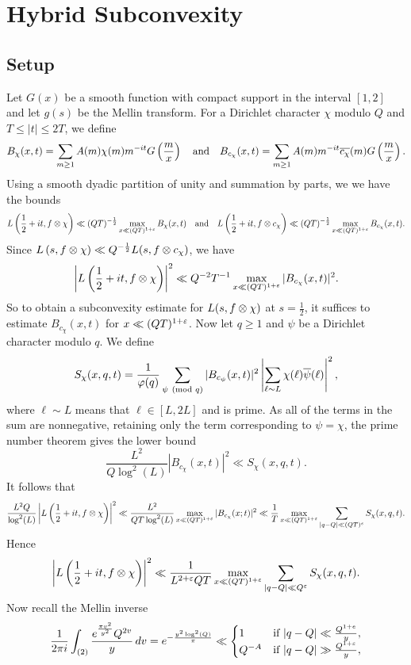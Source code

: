 \documentclass[12pt,reqno,oneside]{amsart}
\begin{document}
\section{Hybrid Subconvexity}
  \subsection*{Setup}
    Let $G(x)$ be a smooth function with compact support in the interval $[1,2]$ and let $g(s)$ be the Mellin transform.
    For a Dirichlet character $\chi$ modulo $Q$ and $T \le |t| \le 2T$, we define
    \[
      B_{\chi}(x,t) = \sum_{m \ge 1}A(m)\chi(m)m^{-it}G\left(\frac{m}{x}\right) \quad \text{and} \quad B_{c_{\chi}}(x,t) = \sum_{m \ge 1}A(m)m^{-it}\overline{c_{\chi}}(m)G\left(\frac{m}{x}\right).
    \]
    Using a smooth dyadic partition of unity and summation by parts, we we have the bounds
    \[
      L\left(\frac{1}{2}+it,f \otimes \chi \right) \ll (QT)^{-\frac{1}{2}}\max_{x \ll (QT)^{1+\varepsilon}}B_{\chi}(x,t) \quad \text{and} \quad L\left(\frac{1}{2}+it,f \otimes c_{\chi} \right) \ll (QT)^{-\frac{1}{2}}\max_{x \ll (QT)^{1+\varepsilon}}B_{c_{\chi}}(x,t).
    \]
    Since $L\left(s,f \otimes \chi\right) \ll Q^{-\frac{1}{2}}L(s,f \otimes c_{\chi})$, we have
    \[
      \left|L\left(\frac{1}{2}+it,f \otimes \chi \right)\right|^{2} \ll Q^{-2}T^{-1}\max_{x \ll (QT)^{1+\varepsilon}}|B_{c_{\chi}}(x,t)|^{2}.
    \]
    So to obtain a subconvexity estimate for $L(s,f \otimes \chi)$ at $s = \frac{1}{2}$, it suffices to estimate $B_{c_{\chi}}(x,t)$ for $x \ll (QT)^{1+\varepsilon}$. Now let $q \ge 1$ and $\psi$ be a Dirichlet character modulo $q$. We define
    \[
      S_{\chi}(x,q,t) = \frac{1}{\varphi(q)}\sum_{\psi \ \left(\text{mod }q\right)}|B_{c_{\psi}}(x,t)|^{2}\left|\sum_{\ell \sim L}\chi(\ell)\overline{\psi}(\ell)\right|^{2},
    \]
    where $\ell \sim L$ means that $\ell \in [L,2L]$ and is prime. As all of the terms in the sum are nonnegative, retaining only the term corresponding to $\psi = \chi$, the prime number theorem gives the lower bound
    \[
      \frac{L^{2}}{Q\log^{2}(L)}|B_{c_{\chi}}(x,t)|^{2} \ll S_{\chi}(x,q,t).
    \]
    It follows that
    \[
      \frac{L^{2}Q}{\log^{2}(L)}\left|L\left(\frac{1}{2}+it,f \otimes \chi \right)\right|^{2} \ll \frac{L^{2}}{QT\log^{2}(L)}\max_{x \ll (QT)^{1+\varepsilon}}|B_{c_{\chi}}(x;t)|^{2} \ll \frac{1}{T}\max_{x \ll (QT)^{1+\varepsilon}}\sum_{|q-Q| \ll (QT)^{\varepsilon}}S_{\chi}(x,q,t).
    \]
    Hence
    \[
      \left|L\left(\frac{1}{2}+it,f \otimes \chi \right)\right|^{2} \ll \frac{1}{L^{2+\varepsilon}QT}\max_{x \ll (QT)^{1+\varepsilon}}\sum_{|q-Q| \ll Q^{\varepsilon}}S_{\chi}(x,q,t).
    \]
    Now recall the Mellin inverse
    \[
      \frac{1}{2\pi i}\int_{(2)}\frac{e^{\frac{\pi v^{2}}{y^{2}}}Q^{2v}}{y}\,dv = e^{-\frac{y^{2}\log^{2}(Q)}{\pi}} \ll \begin{cases} 1 & \text{if $|q-Q| \ll \frac{Q^{1+e}}{y}$}, \\ Q^{-A} & \text{if $|q-Q| \gg \frac{Q^{1+\varepsilon}}{y}$}, \end{cases}
    \]
\end{document}
